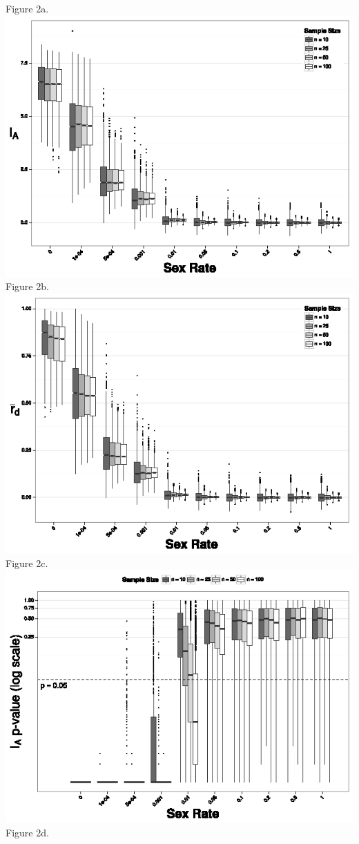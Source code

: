 \documentclass[letterpaper, 10pt]{article}
\begin{document}
\begin{center}
Figure 2a.\\
\includegraphics{figures/Ia_chart2.eps}\\Figure 2b.\\
\includegraphics{figures/rbarD_chart2.eps}\\Figure 2c.\\
\includegraphics{figures/Ia_pval2.eps}\\Figure 2d.\\

\end{center}
\end{document}
